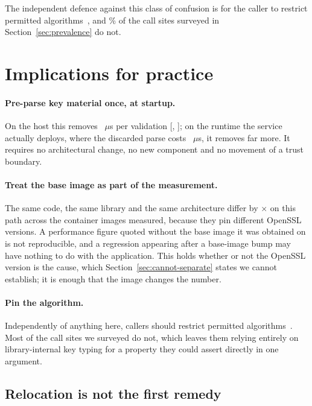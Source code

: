 \documentclass[pdflatex,sn-basic,twocolumn]{sn-jnl}%
\begin{document}
The independent defence against this class of confusion is for the caller to
restrict permitted algorithms~\cite{rfc8725}, and \SampleNoAlgorithmsPct\% of the
call sites surveyed in Section~\ref{sec:prevalence} do not.

\section{Implications for practice}\label{sec:implications}

\paragraph{Pre-parse key material once, at startup.} On the host this removes
\HostStringPenalty~$\mu$s per validation
[\HostStringPenaltyCiLo, \HostStringPenaltyCiHi]; on the runtime the service
actually deploys, where the discarded parse costs
\NodeEighteenProbeThrows~$\mu$s, it removes far more. It requires no
architectural change, no new component and no movement of a trust boundary.

\paragraph{Treat the base image as part of the measurement.} The same code, the
same library and the same architecture differ by \SpanProbeThrows$\times$ on this
path across the container images measured, because they pin different OpenSSL
versions. A performance figure quoted without the base image it was obtained on
is not reproducible, and a regression appearing after a base-image bump may have
nothing to do with the application. This holds whether or not the OpenSSL version
is the cause, which Section~\ref{sec:cannot-separate} states we cannot establish;
it is enough that the image changes the number.

\paragraph{Pin the algorithm.} Independently of anything here, callers should
restrict permitted algorithms~\cite{rfc8725}. Most of the call sites we surveyed
do not, which leaves them relying entirely on library-internal key typing for a
property they could assert directly in one argument.

\subsection{Relocation is not the first remedy}\label{sec:offload}
\end{document}
